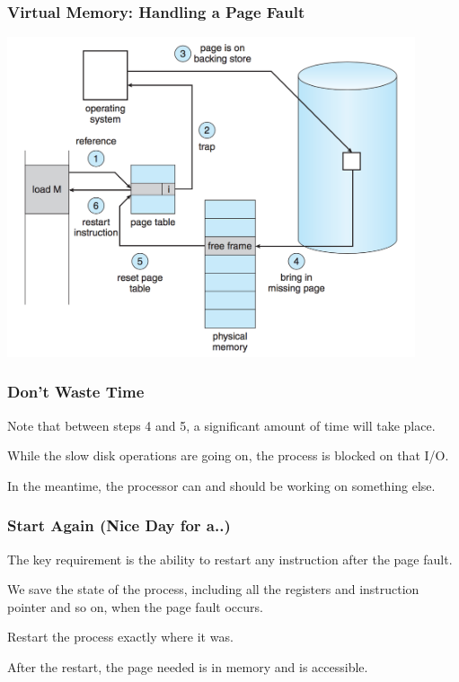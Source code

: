 \begin{frame}
\frametitle{Virtual Memory: Handling a Page Fault}

\begin{center}
\includegraphics[width=0.9\textwidth]{images/handling-page-fault.png}
\end{center}


\end{frame}

\begin{frame}
\frametitle{Don't Waste Time}

Note that between steps 4 and 5, a significant amount of time will take place.

While the slow disk operations are going on, the process is blocked on that I/O.

In the meantime, the processor can and should be working on something else.

\end{frame}

\begin{frame}
\frametitle{Start Again (Nice Day for a..)}

The key requirement is the ability to restart any instruction after the page fault.

We save the state of the process, including all the registers and instruction pointer and so on, when the page fault occurs. 

Restart the process exactly where it was. 

After the restart, the page needed is in memory and is accessible.

\end{frame}


